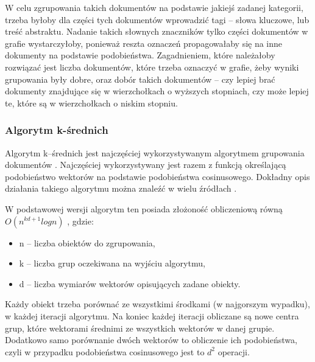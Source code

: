 \documentclass{article}
\begin{document}
W celu zgrupowania takich dokumentów na podstawie jakiejś zadanej kategorii, trzeba byłoby dla części tych dokumentów wprowadzić tagi – słowa kluczowe, lub treść abstraktu. Nadanie takich słownych znaczników tylko części dokumentów w grafie wystarczyłoby, ponieważ reszta oznaczeń propagowałaby się na inne dokumenty na podstawie podobieństwa. Zagadnieniem, które należałoby rozwiązać jest liczba dokumentów, które trzeba oznaczyć w grafie, żeby wyniki grupowania były dobre, oraz dobór takich dokumentów – czy lepiej brać dokumenty znajdujące się w wierzchołkach o wyższych stopniach, czy może lepiej te, które są w wierzchołkach o niskim stopniu.

\subsubsection{Algorytm k-średnich}

Algorytm k--średnich jest najczęściej wykorzystywanym algorytmem grupowania dokumentów \cite{doc_clust_comp,iterative_clutering}. Najczęściej wykorzystywany jest razem z funkcją określającą podobieństwo wektorów na podstawie podobieństwa cosinusowego. Dokładny opis działania takiego algorytmu można znaleźć w wielu źródłach \cite{jain2010data,doc_clust_comp}.

W podstawowej wersji algorytm ten posiada złożoność obliczeniową równą $O(n^{kd+1}log n)$ , gdzie:
\begin{itemize}
	\item n – liczba obiektów do zgrupowania,
	\item k – liczba grup oczekiwana na wyjściu algorytmu,
	\item d – liczba wymiarów wektorów opisujących zadane obiekty.
\end{itemize}
Każdy obiekt trzeba porównać ze wszystkimi środkami (w najgorszym wypadku), w każdej iteracji algorytmu. Na koniec każdej iteracji obliczane są nowe centra grup, które wektorami średnimi ze wszystkich wektorów w danej grupie. Dodatkowo samo porównanie dwóch wektorów to obliczenie ich podobieństwa, czyli w przypadku podobieństwa cosinusowego jest to $d^2$ operacji.



\newpage
\end{document}
